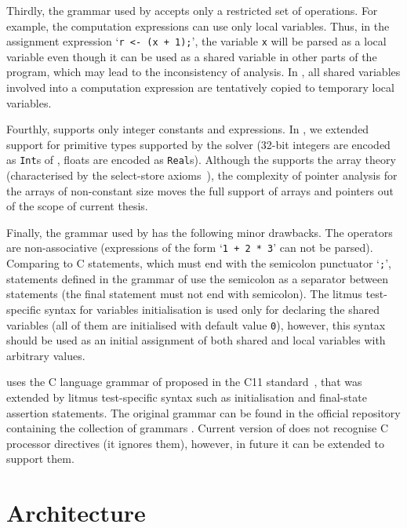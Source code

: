 Thirdly, the grammar used by \oldporthos{} accepts only a restricted set of operations.
For example, the computation expressions can use only local variables.
Thus, in the assignment expression `\lstinline{r <- (x + 1);}', the variable \lstinline{x} will be parsed as a local variable even though it can be used as a shared variable in other parts of the program, which may lead to the inconsistency of analysis.
In \porthos[2], all shared variables involved into a computation expression are tentatively copied to temporary local variables.

Fourthly, \porthos[1] supports only integer constants and expressions.
In \porthos[2], we extended support for primitive types supported by the  solver (32-bit integers are encoded as \texttt{Int}s of , floats are encoded as \texttt{Real}s).
Although the  supports the array theory (characterised by the select-store axioms~\cite{de2011z3}), the complexity of pointer analysis for the arrays of non-constant size moves the full support of arrays and pointers out of the scope of current thesis.

Finally, the grammar used by \porthos{} has the following minor drawbacks. %
The operators are non-associative (expressions of the form `\lstinline{1 + 2 * 3}' can not be parsed).
Comparing to C statements, which must end with the semicolon punctuator `\lstinline{;}', statements defined in the grammar of \porthos[1] use the semicolon as a separator between statements (the final statement must not end with semicolon).
The litmus test-specific syntax for variables initialisation is used only for declaring the shared variables (all of them are initialised with default value \lstinline{0}), however, this syntax should be used as an initial assignment of both shared and local variables with arbitrary values.

\porthos[2] uses the C language grammar of proposed in the C11 standard~\cite{c11}, that was extended by litmus test-specific syntax such as initialisation and final-state assertion statements. The original  grammar can be found in the official repository containing the collection of  grammars%
%
. %
%
Current version of \porthos[2] does not recognise C processor directives (it ignores them), however, in future it can be extended to support them.


\section{Architecture}
\label{ch:impl:arch}

